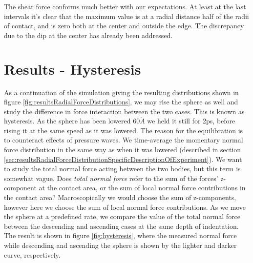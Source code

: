 \documentclass[twoside,english]{uiofysmaster}
\begin{document}
 The shear force conforms much better with our expectations.
 At least at the last intervals it's clear that the maximum value is at a radial distance half of the radii of contact, and is zero both at the center and outside the edge. 
 The discrepancy due to the dip at the center has already been addressed. 
 
 


\section{Results - Hysteresis}
As a continuation of the simulation giving the resulting distributions shown in figure \ref{fig:resultsRadialForceDistributions}, we may rise the sphere as well and study the difference in force interaction between the two cases. 
This is known as hysteresis.
As the sphere has been lowered $60\mathring{A}$ we held it still for 2ps, before rising it at the same speed as it was lowered. 
The reason for the equilibration is to counteract effects of pressure waves. 
We time-average the momentary normal force distribution in the same way as when it was lowered (described in section \ref{sec:resultsRadialForceDistributionSpecificDescriptionOfExperiment}).
We want to study the total normal force acting between the two bodies, but this term is somewhat vague. 
Does \textit{total normal force} refer to the sum of the forces' z-component at the contact area, or the sum of local normal force contributions in the contact area? 
Macroscopically we would choose the sum of z-components, however here we choose the sum of local normal force contributions.
As we move the sphere at a predefined rate, we compare the value of the total normal force between the descending and ascending cases at the same depth of indentation.  
The result is shown in figure \ref{fig:hysteresis}, where the measured normal force while descending and ascending the sphere is shown by the lighter and darker curve, respectively. 
\end{document}
